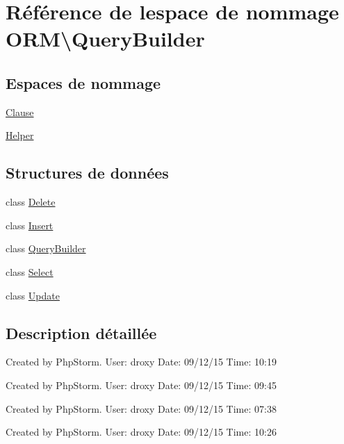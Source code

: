 \hypertarget{namespace_o_r_m_1_1_query_builder}{}\section{Référence de l\textquotesingle{}espace de nommage O\+RM\textbackslash{}Query\+Builder}
\label{namespace_o_r_m_1_1_query_builder}
\subsection*{Espaces de nommage}
\begin{DoxyCompactItemize}
\item 
 \hyperlink{namespace_o_r_m_1_1_query_builder_1_1_clause}{Clause}
\item 
 \hyperlink{namespace_o_r_m_1_1_query_builder_1_1_helper}{Helper}
\end{DoxyCompactItemize}
\subsection*{Structures de données}
\begin{DoxyCompactItemize}
\item 
class \hyperlink{class_o_r_m_1_1_query_builder_1_1_delete}{Delete}
\item 
class \hyperlink{class_o_r_m_1_1_query_builder_1_1_insert}{Insert}
\item 
class \hyperlink{class_o_r_m_1_1_query_builder_1_1_query_builder}{Query\+Builder}
\item 
class \hyperlink{class_o_r_m_1_1_query_builder_1_1_select}{Select}
\item 
class \hyperlink{class_o_r_m_1_1_query_builder_1_1_update}{Update}
\end{DoxyCompactItemize}


\subsection{Description détaillée}
Created by Php\+Storm. User\+: droxy Date\+: 09/12/15 Time\+: 10\+:19

Created by Php\+Storm. User\+: droxy Date\+: 09/12/15 Time\+: 09\+:45

Created by Php\+Storm. User\+: droxy Date\+: 09/12/15 Time\+: 07\+:38

Created by Php\+Storm. User\+: droxy Date\+: 09/12/15 Time\+: 10\+:26 